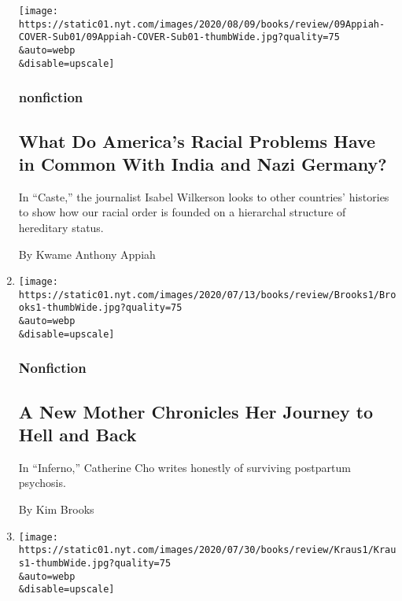 \begin{enumerate}
  \texttt{[image: https://static01.nyt.com/images/2020/08/09/books/review/09Appiah-COVER-Sub01/09Appiah-COVER-Sub01-thumbWide.jpg?quality=75\\\&auto=webp\\\&disable=upscale]}

  \hypertarget{nonfiction-3}{%
  \subsubsection{nonfiction}\label{nonfiction-3}}

  \hypertarget{what-do-americas-racial-problems-have-in-common-with-india-and-nazi-germany}{%
  \subsection{What Do America's Racial Problems Have in Common With
  India and Nazi
  Germany?}\label{what-do-americas-racial-problems-have-in-common-with-india-and-nazi-germany}}

  In ``Caste,'' the journalist Isabel Wilkerson looks to other
  countries' histories to show how our racial order is founded on a
  hierarchal structure of hereditary status.

  By Kwame Anthony Appiah
\item
  \href{/2020/08/04/books/review/inferno-catherine-cho.html}{}

  \texttt{[image: https://static01.nyt.com/images/2020/07/13/books/review/Brooks1/Brooks1-thumbWide.jpg?quality=75\\\&auto=webp\\\&disable=upscale]}

  \hypertarget{nonfiction-4}{%
  \subsubsection{Nonfiction}\label{nonfiction-4}}

  \hypertarget{a-new-mother-chronicles-her-journey-to-hell-and-back}{%
  \subsection{A New Mother Chronicles Her Journey to Hell and
  Back}\label{a-new-mother-chronicles-her-journey-to-hell-and-back}}

  In ``Inferno,'' Catherine Cho writes honestly of surviving postpartum
  psychosis.

  By Kim Brooks
\item
  \href{/2020/08/04/books/review/tender-is-the-flesh-agustina-bazterrica.html}{}

  \texttt{[image: https://static01.nyt.com/images/2020/07/30/books/review/Kraus1/Kraus1-thumbWide.jpg?quality=75\\\&auto=webp\\\&disable=upscale]}


\end{enumerate}
